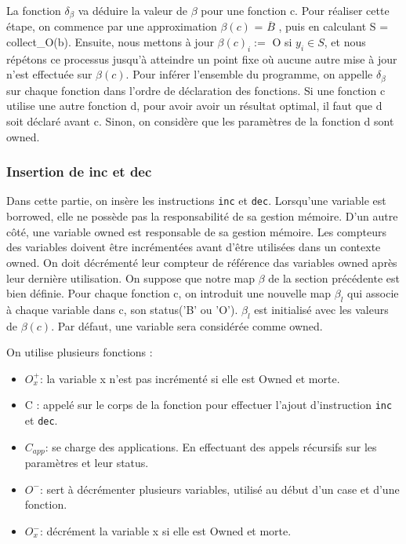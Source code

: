 \documentclass{rapportECL}
\begin{document}
La fonction $\delta_{\beta}$ va déduire la valeur de $\beta$ pour une fonction c. 
Pour réaliser cette étape, on commence par une approximation $\beta(c)$ = $\overline{B}$ , puis en calculant S = collect\_O(b). 
Ensuite, nous mettons à jour  $\beta(c)_i :=$ O  si $y_i \in S $, et nous répétons ce processus jusqu'à atteindre un point fixe où aucune autre mise à jour 
n'est effectuée sur $\beta(c)$.
Pour inférer l'ensemble du programme, on appelle $\delta_{\beta}$ sur chaque fonction dans l'ordre de déclaration des fonctions. 
Si une fonction c utilise une autre fonction d, pour avoir avoir un résultat optimal, il faut que d soit déclaré avant c. 
Sinon, on considère que les paramètres de la fonction d sont owned.


\subsubsection{Insertion de inc et dec}
Dans cette partie, on insère les instructions \verb|inc| et \verb|dec|.
Lorsqu'une variable est borrowed, elle ne possède pas la responsabilité de sa gestion mémoire. 
D'un autre côté, une variable owned est responsable de sa gestion mémoire.
Les compteurs des variables doivent être incrémentées avant d'être utilisées dans un contexte owned.
On doit décrémenté leur compteur de référence das variables owned après leur dernière utilisation. 
On suppose que notre map $\beta$ de la section précédente est bien définie. 
Pour chaque fonction c, on introduit une nouvelle map $\beta_l$ qui associe à chaque variable dans c, son status('B' ou 'O'). 
$\beta_l$ est initialisé avec les valeurs de $\beta(c)$. Par défaut, une variable sera considérée comme owned.

On utilise plusieurs fonctions :
\begin{itemize}
    \item $O_x^{+}$: la variable x n'est pas incrémenté si elle est Owned et morte.
    \item C : appelé sur le corps de la fonction pour effectuer l'ajout d'instruction \verb|inc| et \verb|dec|.
    \item $C_{app}$: se charge des applications. En effectuant des appels récursifs sur les paramètres et leur status.
    \item $O^{-}$: sert à décrémenter plusieurs variables, utilisé au début d'un case et d'une fonction.
    \item  $O_x^{-}$: décrément la variable x si elle est Owned et morte.   
\end{itemize}
\end{document}
